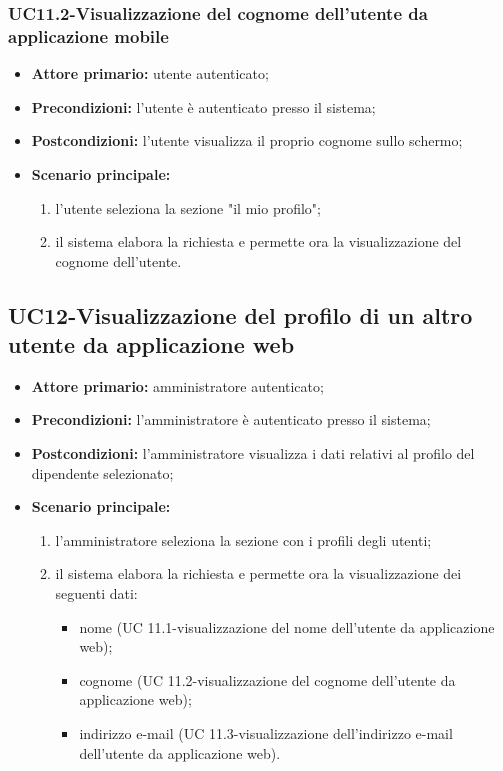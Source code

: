 \subsubsection{UC11.2-Visualizzazione del cognome dell'utente da applicazione mobile}
\begin{itemize}
	\item \textbf{Attore primario:} utente autenticato;

	\item \textbf{Precondizioni:} l'utente è autenticato presso il sistema;

	\item \textbf{Postcondizioni:} l'utente visualizza il proprio cognome sullo schermo;

	\item \textbf{Scenario principale:}
		\begin{enumerate}
    	\item  l'utente seleziona la sezione "il mio profilo";
    	\item  il sistema elabora la richiesta e permette ora la visualizzazione del cognome dell'utente.
		\end{enumerate}
\end{itemize}


\subsection{UC12-Visualizzazione del profilo di un altro utente da applicazione web}
\begin{itemize}
	\item \textbf{Attore primario:} amministratore autenticato;

	\item \textbf{Precondizioni:} l'amministratore è autenticato presso il sistema;

	\item \textbf{Postcondizioni:} l'amministratore visualizza i dati relativi al profilo del dipendente selezionato;

	\item \textbf{Scenario principale:}
	\begin{enumerate}
    	\item  l'amministratore seleziona la sezione con i profili degli utenti;
    	\item  il sistema elabora la richiesta e permette ora la visualizzazione dei seguenti dati:
    	\begin{itemize}
        	\item nome (UC 11.1-visualizzazione del nome dell'utente da applicazione web);
        	\item cognome (UC 11.2-visualizzazione del cognome dell'utente da applicazione web);
        	\item indirizzo e-mail (UC 11.3-visualizzazione dell'indirizzo e-mail dell'utente da applicazione web).
    	\end{itemize}
	\end{enumerate}
\end{itemize}

